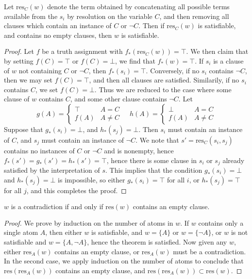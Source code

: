 \begin{lemma}
    Let $\text{res}_C(w)$ denote the term obtained by concatenating all possible terms available from the $s_i$ by resolution on the variable $C$, and then removing all clauses which contain an instance of $C$ or $\neg C$. Then if $\text{res}_C(w)$ is satisfiable, and contains no empty clauses, then $w$ is satisfiable.
\end{lemma}
\begin{proof}
    Let $f$ be a truth assignment with $f_*(\text{res}_C(w)) = \top$. We then claim that by setting $f(C) = \top$ or $f(C) = \bot$, we find that $f_*(w) = \top$. If $s_i$ is a clause of $w$ not containing $C$ or $\neg C$, then $f_*(s_i) = \top$. Conversely, if no $s_i$ contains $\neg C$, then we may set $f(C) = \top$, and then all clauses are satisfied. Similarily, if no $s_i$ contains $C$, we set $f(C) = \bot$. Thus we are reduced to the case where some clause of $w$ contains $C$, and some other clause contains $\neg C$. Let
    \[ g(A) = \begin{cases} \top & A = C\\f(A) & A \neq C \end{cases}\ \ \ \ \ h(A) = \begin{cases} \bot & A = C\\ f(A) & A \neq C \end{cases} \]
    Suppose that $g_*(s_i) = \bot$, and $h_*(s_j) = \bot$. Then $s_i$ must contain an instance of $C$, and $s_j$ must contain an instance of $\neg C$. We note that $s' = \text{res}_C(s_i,s_j)$ contains no instances of $C$ or $\neg C$ and is nonempty, hence $f_*(s') = g_*(s') = h_*(s') = \top$, hence there is some clause in $s_i$ or $s_j$ already satisfied by the interpretation of $s$. This implies that the condition $g_*(s_i) = \bot$ and $h_*(s_j) = \bot$ is impossible, so either $g_*(s_i) = \top$ for all $i$, or $h_*(s_j) = \top$ for all $j$, and this completes the proof.
\end{proof}

\begin{theorem}
    $w$ is a contradiction if and only if $\text{res}(w)$ contains an empty clause.
\end{theorem}
\begin{proof}
    We prove by induction on the number of atoms in $w$. If $w$ contains only a single atom $A$, then either $w$ is satisfiable, and $w = \{ A \}$ or $w = \{ \neg A \}$, or $w$ is not satisfiable and $w = \{ A, \neg A \}$, hence the theorem is satisfied. Now given any $w$, either $\text{res}_A(w)$ contains an empty clause, or $\text{res}_A(w)$ must be a contradiction. In the second case, we apply induction on the number of atoms to conclude that $\text{res}(\text{res}_A(w))$ contains an empty clause, and $\text{res}(\text{res}_A(w)) \subset \text{res}(w)$.
\end{proof}


